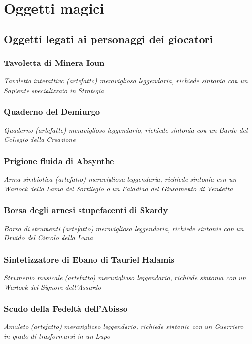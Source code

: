 
\chapter{Oggetti magici}

\section{Oggetti legati ai personaggi dei giocatori}

\subsection{Tavoletta di Minera Ioun}
\textit{Tavoletta interattiva (artefatto) meravigliosa leggendaria, richiede sintonia con un Sapiente specializzato in Strategia}

\subsection{Quaderno del Demiurgo}
\textit{Quaderno (artefatto) meraviglioso leggendario, richiede sintonia con un Bardo del Collegio della Creazione}

\subsection{Prigione fluida di Absynthe}
\textit{Arma simbiotica (artefatto) meravigliosa leggendaria, richiede sintonia con un Warlock della Lama del Sortilegio o un Paladino del Giuramento di Vendetta}

\subsection{Borsa degli arnesi stupefacenti di Skardy}
\textit{Borsa di strumenti (artefatto) meravigliosa leggendaria, richiede sintonia con un Druido del Circolo della Luna}

\subsection{Sintetizzatore di Ebano di Tauriel Halamis}
\textit{Strumento musicale (artefatto) meraviglioso leggendario, richiede sintonia con un Warlock del Signore dell'Assurdo}

\subsection{Scudo della Fedeltà dell'Abisso}
\textit{Amuleto (artefatto) meraviglioso leggendario, richiede sintonia con un Guerriero in grado di trasformarsi in un Lupo}

